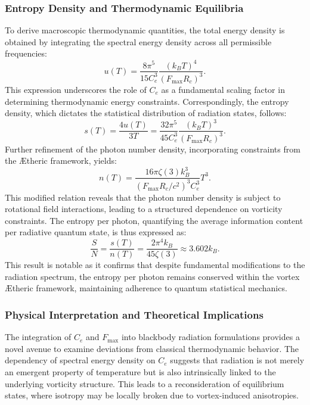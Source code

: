 \documentclass[a4paper,10pt]{article}
\begin{document}
\subsubsection*{Entropy Density and Thermodynamic Equilibria}
To derive macroscopic thermodynamic quantities, the total energy density is obtained by integrating the spectral energy density across all permissible frequencies:
\begin{equation*}
u(T) = \frac{8 \pi^5}{15 C_e^3} \frac{(k_B T)^4}{(F_{\max} R_c)^3}.
\end{equation*}
This expression underscores the role of $C_e$ as a fundamental scaling factor in determining thermodynamic energy constraints. Correspondingly, the entropy density, which dictates the statistical distribution of radiation states, follows:
\begin{equation*}
s(T) = \frac{4 u(T)}{3 T} = \frac{32 \pi^5}{45 C_e^3} \frac{(k_B T)^3}{(F_{\max} R_c)^3}.
\end{equation*}
Further refinement of the photon number density, incorporating constraints from the Ætheric framework, yields:
\begin{equation*}
n(T) = \frac{16 \pi \zeta(3) k_B^3}{(F_{\max} R_c/c^2)^3 C_e^3} T^3.
\end{equation*}
This modified relation reveals that the photon number density is subject to rotational field interactions, leading to a structured dependence on vorticity constraints. The entropy per photon, quantifying the average information content per radiative quantum state, is thus expressed as:
\begin{equation*}
\frac{S}{N} = \frac{s(T)}{n(T)} = \frac{2 \pi^4 k_B}{45 \zeta(3)} \approx 3.602 k_B.
\end{equation*}
This result is notable as it confirms that despite fundamental modifications to the radiation spectrum, the entropy per photon remains conserved within the vortex Ætheric framework, maintaining adherence to quantum statistical mechanics.


\subsubsection*{Physical Interpretation and Theoretical Implications}
The integration of $C_e$ and $F_{\max}$ into blackbody radiation formulations provides a novel avenue to examine deviations from classical thermodynamic behavior. The dependency of spectral energy density on $C_e$ suggests that radiation is not merely an emergent property of temperature but is also intrinsically linked to the underlying vorticity structure. This leads to a reconsideration of equilibrium states, where isotropy may be locally broken due to vortex-induced anisotropies.
\end{document}
